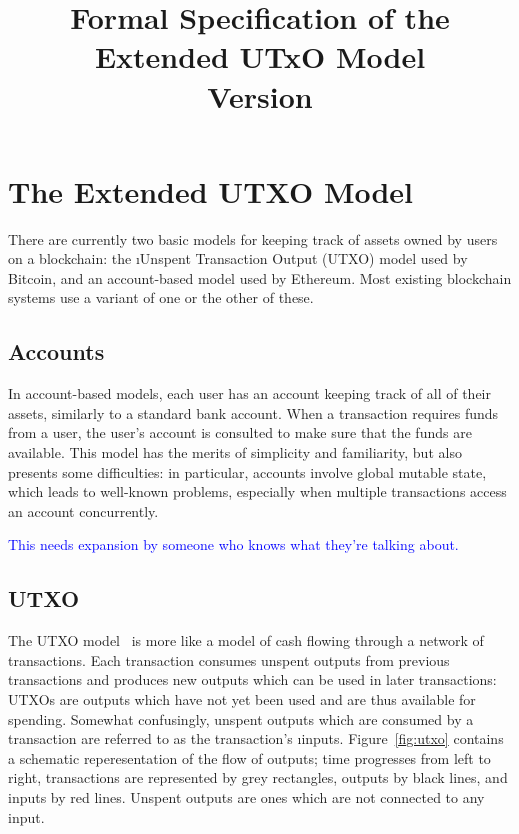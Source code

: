 \documentclass[a4paper]{article}
\newcommand{\blue}[1]{\textcolor{blue}{#1}}
\theoremstyle{definition}  %
\begin{document}
\title{Formal Specification of the Extended UTxO Model\\ Version \version}
\maketitle

\thispagestyle{plain}
\pagestyle{plain}

\section{The Extended UTXO Model}
\label{sec:extended-utxo-model}
There are currently two basic models for keeping track of assets
owned by users on a blockchain: the \i{Unspent Transaction Output}
(UTXO) model used by Bitcoin, and an account-based model used by
Ethereum. Most existing blockchain systems use a variant of one or the
other of these.

\subsection{Accounts}
In account-based models, each user has an account keeping track of all
of their assets, similarly to a standard bank account.  When a
transaction requires funds from a user, the user's account is
consulted to make sure that the funds are available.  This model has
the merits of simplicity and familiarity, but also presents some
difficulties: in particular, accounts involve global mutable state,
which leads to well-known problems, especially when multiple
transactions access an account concurrently.


\blue{This needs expansion by someone who knows what they're talking about.}

\subsection{UTXO}
The UTXO model~\cite[Chapter 3]{Narayanan-bitcoin} is more like a model of cash flowing through a network
of transactions.  Each transaction consumes unspent outputs from
previous transactions and produces new outputs which can be used in
later transactions: UTXOs are outputs which have not yet been used and
are thus available for spending.  Somewhat confusingly, unspent
outputs which are consumed by a transaction are referred to as the
transaction's \i{inputs}. Figure~\ref{fig:utxo} contains a schematic
reperesentation of the flow of outputs; time progresses from left to
right, transactions are represented by grey rectangles, outputs by
black lines, and inputs by red lines.  Unspent outputs are ones which
are not connected to any input.
\end{document}
